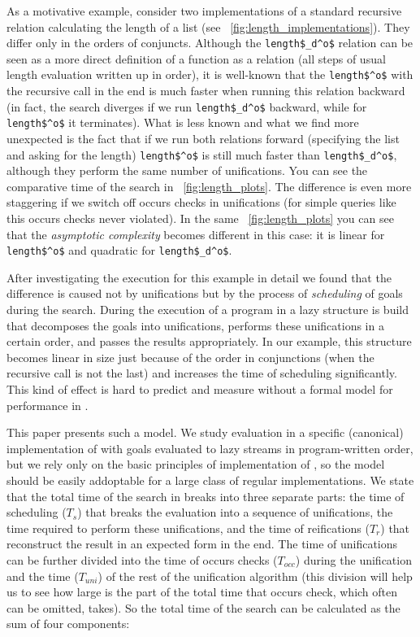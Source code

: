 As a motivative example, consider two implementations of a standard recursive relation calculating the length of a list (see \figureword~\ref{fig:length_implementations}). They differ only in the
orders of conjuncts. Although the \lstinline|length$_d^o$| relation can be seen as a more direct definition of a function as a relation (all steps of usual length evaluation written up in order),
it is well-known that the \lstinline|length$^o$| with the recursive call in the end is much faster when running this relation backward (in fact, the search diverges if we
run \lstinline|length$_d^o$| backward, while for \lstinline|length$^o$| it terminates). What is less known and what we find more unexpected is the fact that if we run both relations
forward (specifying the list and asking for the length) \lstinline|length$^o$| is still much faster than \lstinline|length$_d^o$|, although they perform the same number of unifications. You can see the comparative time of the search in \figureword~\ref{fig:length_plots}. The difference is even
more staggering if we switch off occurs checks in unifications (for simple queries like this occurs checks never violated). In the same \figureword~\ref{fig:length_plots} you can see that
the \emph{asymptotic complexity} becomes different in this case: it is linear for \lstinline|length$^o$| and quadratic for \lstinline|length$_d^o$|.

After investigating the execution for this example in detail we found that the difference is caused not by unifications but by the process of \emph{scheduling} of goals during the search.
During the execution of a program in \mK a lazy structure is build that decomposes the goals into unifications, performs these unifications in a certain order, and passes the results
appropriately. In our example, this structure becomes linear in size just because of the order in conjunctions (when the recursive call is not the last) and increases the time of
scheduling significantly. This kind of effect is hard to predict and measure without a formal model for performance in \mK.

This paper presents such a model. We study evaluation in a specific (canonical) implementation of \mK with goals evaluated to lazy streams in program-written order, but we rely only on the basic principles of implementation of \mK, so the model should be easily addoptable for a large class of regular implementations. We state that the total time of the search in \mK breaks into three separate parts: the time of scheduling ($T_s$) that breaks the evaluation into a sequence of
unifications, the time required to perform these unifications, and the time of reifications ($T_r$) that reconstruct the result in an expected form in the end. The time of unifications can be further
divided into the time of occurs checks ($T_{occ}$) during the unification and the time ($T_{uni}$) of the rest of the unification algorithm (this division will help us to see how large
is the part of the total time that occurs check, which often can be omitted, takes). So the total time of the search can be calculated as the sum of four components:

